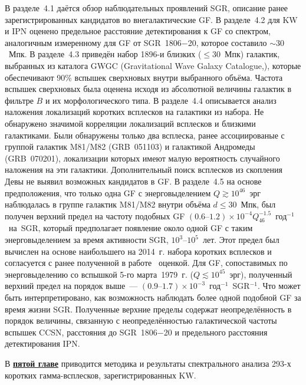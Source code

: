 В разделе~4.1 даётся обзор наблюдательных проявлений SGR, описание ранее зарегистрированных 
кандидатов во внегалактические GF. В разделе~4.2 для KW и IPN оценено предельное 
расстояние детектирования к GF со спектром, аналогичным измеренному для GF от SGR~1806$-$20, 
которое составило $\sim 30$~Мпк. В разделе~4.3 приведён набор 1896-и близких ($\le 30$~Мпк) галактик, 
выбранных из каталога GWGC (Gravitational Wave Galaxy Catalogue,\citep{White2011CQGra}),
которые обеспечивают 90\% вспышек сверхновых внутри выбранного объёма.
Частота вспышек сверхновых была оценена исходя из абсолютной величины галактик 
в фильтре $B$ и их морфологического типа. В разделе~4.4 описывается анализ наложения 
локализаций коротких всплесков на галактики из набора. Не обнаружено значимой 
корреляции локализаций всплесков и близкими галактиками. Были обнаружены только два всплеска, ранее 
ассоциированые с группой галактик M81/M82 (GRB~051103) и галактикой Андромеды (GRB~070201),
локализации которых имеют малую вероятность случайного наложения на эти галактики.
Дополнительный поиск всплесков из скопления Девы не выявил возможных кандидатов в GF.
В разделе~4.5 на основе предположения, что только одна GF с энерговыделением 
$Q \gtrsim 10^{46}$~эрг наблюдалась в группе галактик M81/M82 внутри объёма $d \le 30$~Мпк, 
был получен верхний предел на частоту подобных GF 
${(0.6\textrm{--}1.2)\times 10^{-4} Q_{46}^{-1.5}}$~год$^{-1}$~на~SGR, который предполагает 
появление около одной GF с таким энерговыделением за время активности SGR, $10^3\textrm{--}10^5$~лет. 
Этот предел был вычислен на основе наибольшего на 2014~г.  
набора коротких всплесков и согласуется с ранее полученной в работе~\citep{Ofek_2007ApJ} оценкой. 
Для GF, сопоставимых по энерговыделению со вспышкой 5-го марта~1979~г. ($Q \lesssim 10^{45}$~эрг), 
полученный верхний предел на порядок выше~--- $(0.9\textrm{--}1.7)\times 10^{-3}$~год$^{-1}$~SGR$^{-1}$. 
Что может быть интерпретировано, как возможность наблюдать более одной подобной GF за время жизни SGR.
Полученные верхние пределы содержат неопределённость в порядок величины, связанную с
неопределённостью галактической частоты вспышек CCSN, расстояния до SGR~1806$-$20 и
предельного расстояния детектирования IPN.

В \underline{\textbf{пятой главе}} приводится методика и результаты спектрального 
анализа 293-х коротких гамма-всплесков, зарегистрированных KW.

